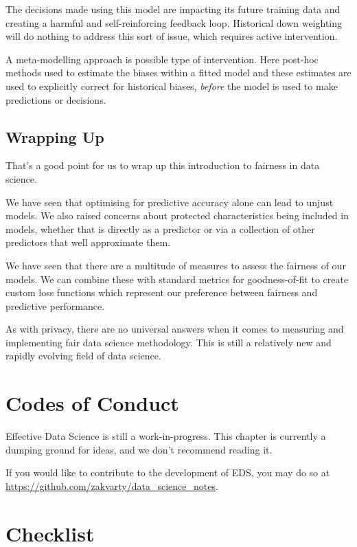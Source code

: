 \documentclass[
  12pt,
]{book}
\begin{document}
The decisions made using this model are impacting its future training data and creating a harmful and self-reinforcing feedback loop. Historical down weighting will do nothing to address this sort of issue, which requires active intervention.

A meta-modelling approach is possible type of intervention. Here post-hoc methods used to estimate the biases within a fitted model and these estimates are used to explicitly correct for historical biases, \emph{before} the model is used to make predictions or decisions.

\hypertarget{wrapping-up-9}{%
\section{Wrapping Up}\label{wrapping-up-9}}

That's a good point for us to wrap up this introduction to fairness in data science.

We have seen that optimising for predictive accuracy alone can lead to unjust models. We also raised concerns about protected characteristics being included in models, whether that is directly as a predictor or via a collection of other predictors that well approximate them.

We have seen that there are a multitude of measures to assess the fairness of our models. We can combine these with standard metrics for goodness-of-fit to create custom loss functions which represent our preference between fairness and predictive performance.

As with privacy, there are no universal answers when it comes to measuring and implementing fair data science methodology. This is still a relatively new and rapidly evolving field of data science.

\hypertarget{ethics-conduct}{%
\chapter{Codes of Conduct}\label{ethics-conduct}}

Effective Data Science is still a work-in-progress. This chapter is currently a dumping ground for ideas, and we don't recommend reading it.

If you would like to contribute to the development of EDS, you may do so at \url{https://github.com/zakvarty/data_science_notes}.

\hypertarget{ethics-checklist}{%
\chapter*{Checklist}\label{ethics-checklist}}
\end{document}
